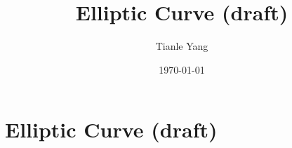 \documentclass{noteformyself}
\title{Elliptic Curve (draft)}
\author{Tianle Yang}
\date{\today}
\begin{document}
    \maketitle

    \section{Elliptic Curve (draft)}


\end{document}
